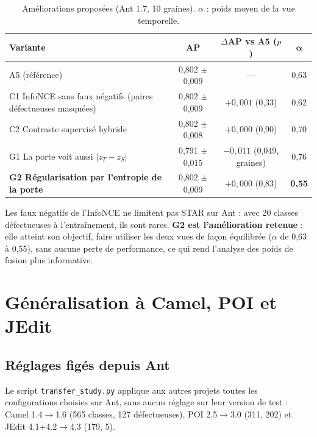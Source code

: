 \documentclass[11pt,a4paper,openany]{report}
\newcommand{\code}[1]{\texttt{\small #1}}
\newcommand{\best}[1]{\textbf{\color{primary}#1}}
\begin{document}
\begin{table}[H]
\centering\small
\caption{Améliorations proposées (Ant 1.7, 10 graines). $\alpha$ : poids moyen de la vue temporelle.}
\label{tab:improve}
\begin{tabularx}{\linewidth}{Xccc}
\toprule
\textbf{Variante} & \textbf{AP} & \textbf{$\Delta$AP vs A5 ($p$)} & $\boldsymbol{\alpha}$ \\
\midrule
A5 (référence)                                                  & 0,802 $\pm$ 0,009 & --- & 0,63 \\
C1 InfoNCE sans faux négatifs (paires défectueuses masquées)    & 0,802 $\pm$ 0,009 & $+0{,}001$ (0,33) & 0,62 \\
C2 Contraste supervisé hybride~\cite{khosla2020}                & 0,802 $\pm$ 0,008 & $+0{,}000$ (0,90) & 0,70 \\
G1 La porte voit aussi $|z_T-z_S|$                              & 0,791 $\pm$ 0,015 & $-0{,}011$ (0,049, graines) & 0,76 \\
\textbf{G2 Régularisation par l'entropie de la porte}           & 0,802 $\pm$ 0,009 & $+0{,}000$ (0,83) & \best{0,55} \\
\bottomrule
\end{tabularx}
\end{table}

Les faux négatifs de l'InfoNCE ne limitent pas STAR sur Ant : avec 20 classes défectueuses à l'entraînement, ils sont
rares. \textbf{G2 est l'amélioration retenue} : elle atteint son objectif, faire utiliser les deux vues de façon
équilibrée ($\alpha$ de 0,63 à 0,55), sans aucune perte de performance, ce qui rend l'analyse des poids de fusion plus
informative.

\newpage
\section{Généralisation à Camel, POI et JEdit}
\label{sec:transfer}
\subsection{Réglages figés depuis Ant}
Le script \code{transfer\_study.py} applique aux autres projets toutes les configurations choisies sur Ant, sans
aucun réglage sur leur version de test : Camel 1.4$\to$1.6 (565 classes, 127 défectueuses), POI 2.5$\to$3.0 (311,
202) et JEdit 4.1+4.2$\to$4.3 (179, 5).
\end{document}
